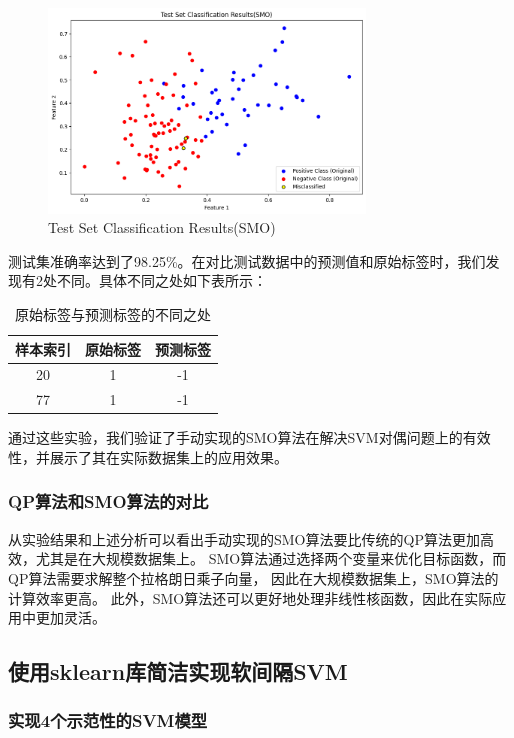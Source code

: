 \documentclass[12pt]{article}
\begin{document}
\begin{figure}[htbp]
  \centering
  \includegraphics[width=0.75\textwidth]{figures/SMO_test.png}
  \caption{Test Set Classification Results(SMO)}
  \label{SMO_test}
\end{figure}
测试集准确率达到了98.25\%。在对比测试数据中的预测值和原始标签时，我们发现有2处不同。具体不同之处如下表所示：

\begin{table}[h]
  \centering
  \begin{tabular}{ccc}
    \toprule
    样本索引 & 原始标签 & 预测标签 \\
    \midrule
    20   & 1    & -1   \\
    77   & 1    & -1   \\
    \bottomrule
  \end{tabular}
  \caption{原始标签与预测标签的不同之处}
\end{table}

通过这些实验，我们验证了手动实现的SMO算法在解决SVM对偶问题上的有效性，并展示了其在实际数据集上的应用效果。


\subsubsection{QP算法和SMO算法的对比}
从实验结果和上述分析可以看出手动实现的SMO算法要比传统的QP算法更加高效，尤其是在大规模数据集上。
SMO算法通过选择两个变量来优化目标函数，而QP算法需要求解整个拉格朗日乘子向量，
因此在大规模数据集上，SMO算法的计算效率更高。
此外，SMO算法还可以更好地处理非线性核函数，因此在实际应用中更加灵活。


\subsection{使用sklearn库简洁实现软间隔SVM}

\subsubsection{实现4个示范性的SVM模型}
\end{document}

